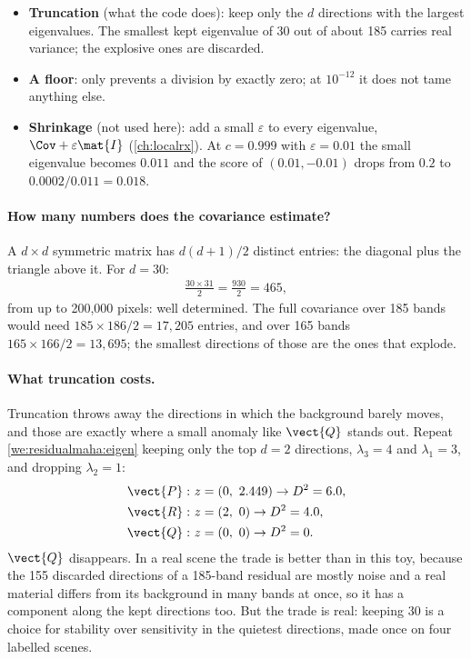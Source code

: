 \begin{itemize}
\item \textbf{Truncation} (what the code does): keep only the $d$ directions with the largest eigenvalues.
  The smallest kept eigenvalue of 30 out of about 185 carries real variance; the explosive ones are
  discarded.
\item \textbf{A floor}:  only prevents a division by exactly zero; at
  $10^{-12}$ it does not tame anything else.
\item \textbf{Shrinkage} (not used here): add a small $\varepsilon$ to every eigenvalue,
  $\Cov+\varepsilon\mat{I}$ (\cref{ch:localrx}). At $c=0.999$ with $\varepsilon=0.01$ the small eigenvalue
  becomes $0.011$ and the score of $(0.01,-0.01)$ drops from $0.2$ to $0.0002/0.011=0.018$.
\end{itemize}

\paragraph{How many numbers does the covariance estimate?} A $d\times d$ symmetric matrix has
$d(d+1)/2$ distinct entries: the diagonal plus the triangle above it. For $d=30$:
\begin{align*}
\frac{30\times31}{2} = \frac{930}{2} = 465,
\end{align*}
from up to 200,000 pixels: well determined. The full covariance over 185 bands would need
$185\times186/2=17{,}205$ entries, and over 165 bands $165\times166/2=13{,}695$; the smallest directions of
those are the ones that explode.

\paragraph{What truncation costs.} Truncation throws away the directions in which the background barely moves,
and those are exactly where a small anomaly like $\vect{Q}$ stands out. Repeat \cref{we:residualmaha:eigen}
keeping only the top $d=2$ directions, $\lambda_3=4$ and $\lambda_1=3$, and dropping $\lambda_2=1$:
\begin{align*}
\vect{P}: & \ z=(0,\ 2.449) \to D^2 = 6.0,\\
\vect{R}: & \ z=(2,\ 0) \to D^2 = 4.0,\\
\vect{Q}: & \ z=(0,\ 0) \to D^2 = 0.
\end{align*}
$\vect{Q}$ disappears. In a real scene the trade is better than in this toy, because the 155 discarded
directions of a 185-band residual are mostly noise and a real material differs from its background in many
bands at once, so it has a component along the kept directions too. But the trade is real: keeping 30 is a
choice for stability over sensitivity in the quietest directions, made once on four labelled scenes.

